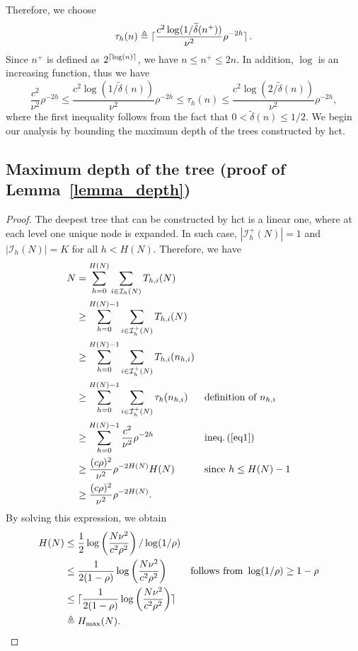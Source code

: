 Therefore, we choose
\[
    \tau_h(n) \triangleq \lceil\frac{c^2\log(1/\widetilde{\delta}(n^+))}{\nu^2}\rho^{-2h}\rceil\,.
\]
Since $n^+$ is defined as $2^{\lceil\log(n)\rceil}$, we have $n \leq n^+ \leq 2n$. In addition, $\log$ is an increasing function, thus we have
\begin{equation} \label{eq1}
    \frac{c^2}{\nu^2}\rho^{-2h} \leq \frac{c^2 \log(1/\tilde{\delta}(n))}{\nu^2}\rho^{-2h} \leq \tau_h(n) \leq \frac{c^2\log(2/\tilde{\delta}(n))}{\nu^2}\rho^{-2h},
\end{equation}
where the first inequality follows from the fact that $0<\tilde{\delta}(n)\leq1/2$. We begin our analysis by bounding the maximum depth of the trees constructed by \gls{hct}.

\subsection{Maximum depth of the tree (proof of Lemma~\ref{lemma_depth})}\label{proof:lemma_depth}
\restalemmadepth*

\begin{proof}
The deepest tree that can be constructed by \gls{hct} is a linear one, where at each level one unique node is expanded. In such case,   $|\mathcal{I}_h^{+}(N)|=1$ and $|\mathcal{I}_h(N)|=K$ for all $h<H(N)$. Therefore, we have
\begin{align*}
    N & = \sum_{h=0}^{H(N)}\sum_{i\in\mathcal{I}_h(N)} T_{h,i}(N) \\
      & \geq \sum_{h=0}^{H(N)-1}\sum_{i\in\mathcal{I}_h^{+}(N)} T_{h,i}(N) \\
      & \geq \sum_{h=0}^{H(N)-1}\sum_{i\in\mathcal{I}_h^{+}(N)} T_{h,i}(n_{h,i}) \\
      & \geq \sum_{h=0}^{H(N)-1}\sum_{i\in\mathcal{I}_h^{+}(N)} \tau_h(n_{h,i}) && \text{definition of } n_{h,i} \\
      & \geq \sum_{h=0}^{H(N)-1}\frac{c^2}{\nu^2}\rho^{-2h} && \text{ineq.\,(\ref{eq1})} \\
      & \geq \frac{(c\rho)^2}{\nu^2}\rho^{-2H(N)}H(N) && \text{since } h\leq H(N)-1 \\
      & \geq \frac{(c\rho)^2}{\nu^2}\rho^{-2H(N)}.
\end{align*}
By solving this expression, we obtain
\begin{align*}
    H(N) & \leq \frac{1}{2}\log\left(                \frac{N\nu^2}{c^2\rho^2} \right)/\log(1/\rho) \\
         & \leq \frac{1}{2(1-\rho)}\log\left(
    \frac{N\nu^2}{c^2\rho^2} \right) && \text{follows from } \log(1/\rho)\geq 1-\rho \\
	& \leq \lceil\frac{1}{2(1-\rho)}\log\left(
    \frac{N\nu^2}{c^2\rho^2} \right)\rceil \\
         & \triangleq H_{\max}(N).
\end{align*}
\end{proof}


